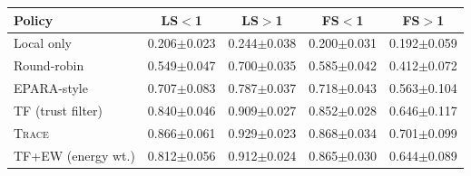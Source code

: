\begin{tabular}{lcccc}
\toprule
Policy & LS$<$1 & LS$>$1 & FS$<$1 & FS$>$1 \\
\midrule
Local only & 0.206$\pm$0.023 & 0.244$\pm$0.038 & 0.200$\pm$0.031 & 0.192$\pm$0.059 \\
Round-robin & 0.549$\pm$0.047 & 0.700$\pm$0.035 & 0.585$\pm$0.042 & 0.412$\pm$0.072 \\
EPARA-style & 0.707$\pm$0.083 & 0.787$\pm$0.037 & 0.718$\pm$0.043 & 0.563$\pm$0.104 \\
TF (trust filter) & 0.840$\pm$0.046 & 0.909$\pm$0.027 & 0.852$\pm$0.028 & 0.646$\pm$0.117 \\
\textsc{Trace} & 0.866$\pm$0.061 & 0.929$\pm$0.023 & 0.868$\pm$0.034 & 0.701$\pm$0.099 \\
TF+EW (energy wt.) & 0.812$\pm$0.056 & 0.912$\pm$0.024 & 0.865$\pm$0.030 & 0.644$\pm$0.089 \\
\bottomrule
\end{tabular}
